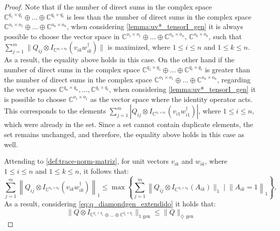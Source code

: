 \begin{proof}
 Note that if the number of direct sums in the complex space $\mathbb{C}^{q_1 \times q_1} \oplus \ldots \oplus \mathbb{C}^{q_t \times q_t}$ is less than the number of direct sums in the complex space $\mathbb{C}^{o_1 \times o_1} \oplus \ldots \oplus \mathbb{C}^{o_n \times o_n}$, when considering \autoref{lemma:uv*_tensorI_gen} it is always possible to choose the vector space in  $\mathbb{C}^{o_1 \times o_1} \oplus \ldots \oplus \mathbb{C}^{o_n \times o_n}$, $\mathbb{C}^{o_k \times o_k}$, such that  $\sum_{j=1}^{m} \|  Q_{ij} \otimes I_{\mathbb{C}^{o_k \times o_k}} (v_{ik} w_{ik}^\dag) \|$ is maximized, where $1 \leq i \leq n$ and $1 \leq k \leq n$. As a result, the equality above holds in this case. On the other hand if the number of direct sums in the complex space $\mathbb{C}^{q_1 \times q_1} \oplus \ldots \oplus \mathbb{C}^{q_t \times q_t}$ is greater than the number of direct sums in the complex space $\mathbb{C}^{o_1 \times o_1} \oplus \ldots \oplus \mathbb{C}^{o_n \times o_n}$,  regarding the vector spaces $\mathbb{C}^{q_n \times q_n} , \ldots, \mathbb{C}^{q_t \times q_t} $, when considering \autoref{lemma:uv*_tensorI_gen} it is possible to choose  $\mathbb{C}^{o_1 \times o_1}$ as the vector space where the identity operator acts. This corresponds to the elements $\sum_{j=1}^{m} | Q_{ij} \otimes I_{\mathbb{C}^{o_1 \times o_1}} (v_{i1} w_{i1}^\dag) |$, where $1 \leq i \leq n$, which were already in the set. Since a set cannot contain duplicate elements, the set remains unchanged, and therefore, the equality above holds in this case as well.

 Attending to \autoref{def:trace-norm-matriz}, for unit vectors $v_{ik}$ and  $w_{ik}$, where  $ 1 \leq i \leq n$ and $ 1 \leq k \leq n$, it follows that:
  \begin{equation}
    \sum_{j=1}^{m} \left\lVert Q_{ij} \otimes I_{\mathbb{C}^{o_k \times o_k}} (v_{ik} w_{ik}^\dag)\right\rVert_{1} \leq \max \left\{ \sum_{j=1}^{m} \left\lVert Q_{ij} \otimes I_{\mathbb{C}^{o_k \times o_k}} (A_{ik}) \rVert_1 \mid \lVert A_{ik}=1   \right\rVert_{1}\right\},
  \end{equation}
   As a result, considering \autoref{eq:q_diamondgen_extendido} it holds that:
  \begin{equation}
    \lVert Q \otimes I_{\mathbb{C}^{q_1 \times q_1} \oplus \ldots \oplus \mathbb{C}^{q_t \times q_t}} \rVert_{1 \text{ gen}} \leq  \lVert Q \rVert_{\diamondsuit \text{ gen}}
  \end{equation}


\end{proof}
